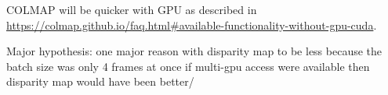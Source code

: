 COLMAP will be quicker with GPU as described in \url{https://colmap.github.io/faq.html#available-functionality-without-gpu-cuda}.

Major hypothesis: one major reason with disparity map to be less because the batch size was only 4 frames at once if multi-gpu access were available then disparity map would have been better/ 











